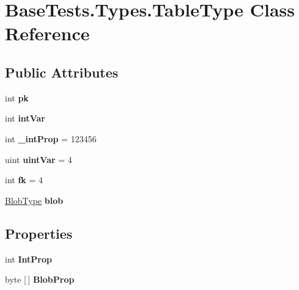 \hypertarget{class_base_tests_1_1_types_1_1_table_type}{}\section{Base\+Tests.\+Types.\+Table\+Type Class Reference}
\label{class_base_tests_1_1_types_1_1_table_type}
\subsection*{Public Attributes}
\begin{DoxyCompactItemize}
\item 
\mbox{\label{class_base_tests_1_1_types_1_1_table_type_abb14850439cf72cba85bad7b4c54f32f}} 
int {\bfseries pk}
\item 
\mbox{\label{class_base_tests_1_1_types_1_1_table_type_ac96fc61cbc59ca606a19fbb72ec42ff0}} 
int {\bfseries int\+Var}
\item 
\mbox{\label{class_base_tests_1_1_types_1_1_table_type_a6078c0d18572937a59ff4b4dc0a94522}} 
int {\bfseries \+\_\+int\+Prop} = 123456
\item 
\mbox{\label{class_base_tests_1_1_types_1_1_table_type_a5584287994bbf69958866d3ad23feeff}} 
uint {\bfseries uint\+Var} = 4
\item 
\mbox{\label{class_base_tests_1_1_types_1_1_table_type_a425a914b6ee5c1dff7fa2f47d8c57fc2}} 
int {\bfseries fk} = 4
\item 
\mbox{\label{class_base_tests_1_1_types_1_1_table_type_abb4e5f2a420c546fc70a4aa725151118}} 
\mbox{\hyperlink{class_base_tests_1_1_types_1_1_blob_type}{Blob\+Type}} {\bfseries blob}
\end{DoxyCompactItemize}
\subsection*{Properties}
\begin{DoxyCompactItemize}
\item 
\mbox{\label{class_base_tests_1_1_types_1_1_table_type_a08cf8ecd229624514fd695b2259e689d}} 
int {\bfseries Int\+Prop}
\item 
\mbox{\label{class_base_tests_1_1_types_1_1_table_type_aa2bea278a987cb00b79198501cdd233b}} 
byte \mbox{[}$\,$\mbox{]} {\bfseries Blob\+Prop}
\end{DoxyCompactItemize}


